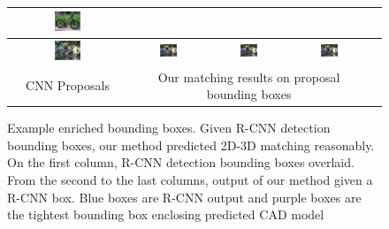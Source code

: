 \documentclass[10pt,twocolumn,letterpaper]{article}
\begin{document}
\begin{figure}[h]
\begin{tabular}{|c|c|c|c|c|}
  \includegraphics[width=0.24\textwidth]{bicycle_cnn/7b.png} &   
  &\\
  \hline
  \includegraphics[width=0.24\textwidth]{bicycle_cnn/4a.png} &   
  \includegraphics[width=0.24\textwidth]{bicycle_cnn/4b.png} &   
  \includegraphics[width=0.24\textwidth]{bicycle_cnn/4c.png} &   
  \includegraphics[width=0.24\textwidth]{bicycle_cnn/4d.png}  \\
  \hline
  CNN Proposals & \multicolumn{3}{|c|}{Our matching results on proposal bounding boxes} \\
  \hline
\end{tabular}
\caption{Example enriched bounding boxes. Given R-CNN\cite{Girshick14} detection bounding boxes, our method predicted 2D-3D matching reasonably. On the first column, R-CNN detection bounding boxes overlaid. From the second to the last columns, output of our method given a R-CNN box. Blue boxes are R-CNN output and purple boxes are the tightest bounding box enclosing predicted CAD model}
  \label{fig:pascal12cnn}
\end{figure}
\end{document}
